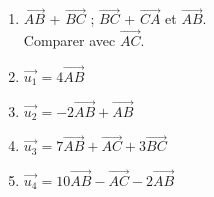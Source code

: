 \documentclass[10pt]{article}
\begin{document}
\begin{multicols}{2}

\begin{enumerate}
\item $\overrightarrow{AB}$ + $\overrightarrow{BC}$ ; $\overrightarrow{BC}$ + $\overrightarrow{CA}$ et  $\overrightarrow{AB}$.\\
Comparer avec  $\overrightarrow{AC}$.
\item  $\overrightarrow{u_1} =  4\overrightarrow{AB}$
\item  $\overrightarrow{u_2} = -2\overrightarrow{AB} + \overrightarrow{AB} $
\item  $\overrightarrow{u_3} =  7\overrightarrow{AB} + \overrightarrow{AC} +  3\overrightarrow{BC}$
\item  $\overrightarrow{u_4} = 10\overrightarrow{AB} - \overrightarrow{AC} - 2\overrightarrow{AB}$
\end{enumerate}

\end{multicols}
\end{document}
